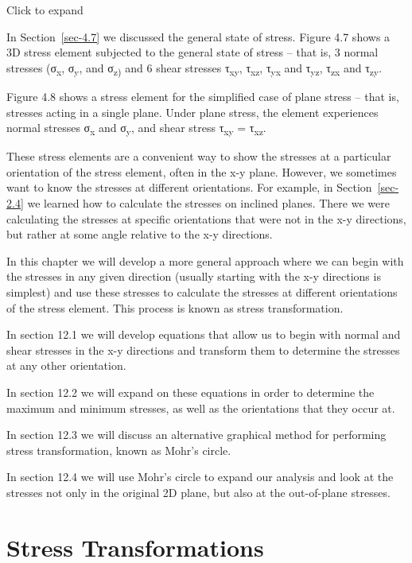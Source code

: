\documentclass[
  letterpaper,
  DIV=11,
  numbers=noendperiod]{scrreprt}
\theoremstyle{definition}
\theoremstyle{remark}
\begin{document}

Click to expand

In Section~\ref{sec-4.7} we discussed the general state of stress.
Figure 4.7 shows a 3D stress element subjected to the general state of
stress -- that is, 3 normal stresses (σ\textsubscript{x},
σ\textsubscript{y}, and σ\textsubscript{z)} and 6 shear stresses
τ\textsubscript{xy}, τ\textsubscript{xz}, τ\textsubscript{yx} and
τ\textsubscript{yz}, τ\textsubscript{zx} and τ\textsubscript{zy}.

Figure 4.8 shows a stress element for the simplified case of plane
stress -- that is, stresses acting in a single plane. Under plane
stress, the element experiences normal stresses σ\textsubscript{x} and
σ\textsubscript{y}, and shear stress τ\textsubscript{xy} =
τ\textsubscript{xz}.

These stress elements are a convenient way to show the stresses at a
particular orientation of the stress element, often in the x-y plane.
However, we sometimes want to know the stresses at different
orientations. For example, in Section~\ref{sec-2.4} we learned how to
calculate the stresses on inclined planes. There we were calculating the
stresses at specific orientations that were not in the x-y directions,
but rather at some angle relative to the x-y directions.

In this chapter we will develop a more general approach where we can
begin with the stresses in any given direction (usually starting with
the x-y directions is simplest) and use these stresses to calculate the
stresses at different orientations of the stress element. This process
is known as stress transformation.

In section 12.1 we will develop equations that allow us to begin with
normal and shear stresses in the x-y directions and transform them to
determine the stresses at any other orientation.

In section 12.2 we will expand on these equations in order to determine
the maximum and minimum stresses, as well as the orientations that they
occur at.

In section 12.3 we will discuss an alternative graphical method for
performing stress transformation, known as Mohr's circle.

In section 12.4 we will use Mohr's circle to expand our analysis and
look at the stresses not only in the original 2D plane, but also at the
out-of-plane stresses.

\section{Stress Transformations}\label{sec-12.1}
\end{document}
